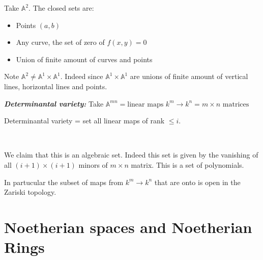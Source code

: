 \begin{example}
    Take $\mathbb{A}^2$. The closed sets are:\begin{itemize}
        \item Points $(a,b)$
        \item Any curve, the set of zero of $f(x,y) = 0$
        \item Union of finite amount of curves and points
    \end{itemize}

    Note $\mathbb{A}^2\neq \mathbb{A}^1\times \mathbb{A}^1$. Indeed since $\mathbb{A}^1\times \mathbb{A}^1$ are unions of finite amount of vertical lines, horizontal lines and points.
\end{example}

\begin{example}
    \textbf{\textit{Determinantal variety:}}
Take $\mathbb{A}^{mn} = \text{linear maps }k^m\rightarrow k^n = m\times n \text{ matrices}$

Determinantal variety = set all linear maps of rank $\leq i$.

\

We claim that this is an algebraic set. Indeed this set is given by the vanishing of all $(i+1)\times (i+1)$ minors of $m\times n$ matrix. This is a set of polynomials.

In partucular the subset of maps from $k^m\rightarrow k^n$ that are onto is open in the Zariski topology.
\end{example}

\section{Noetherian spaces and Noetherian Rings}

